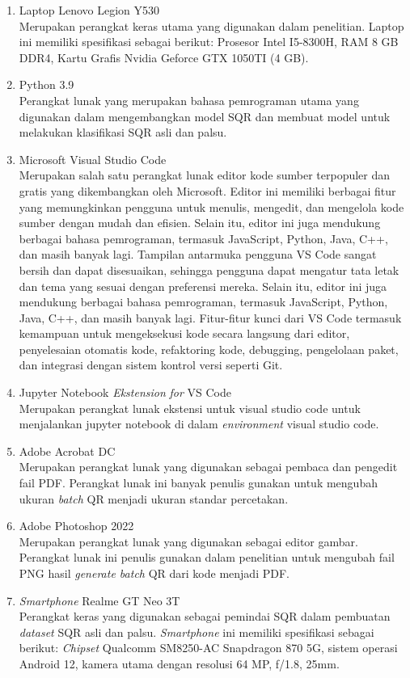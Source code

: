 \begin{enumerate}
	\item Laptop Lenovo Legion Y530\\Merupakan perangkat keras utama yang digunakan dalam penelitian. Laptop ini memiliki spesifikasi sebagai berikut: Prosesor Intel I5-8300H, RAM 8 GB DDR4, Kartu Grafis Nvidia Geforce GTX 1050TI (4 GB).
	\item Python 3.9\\Perangkat lunak yang merupakan bahasa pemrograman utama yang digunakan dalam mengembangkan model SQR dan membuat model untuk melakukan klasifikasi SQR asli dan palsu.
	\item Microsoft Visual Studio Code\\Merupakan salah satu perangkat lunak editor kode sumber terpopuler dan gratis yang dikembangkan oleh Microsoft. Editor ini memiliki berbagai fitur yang memungkinkan pengguna untuk menulis, mengedit, dan mengelola kode sumber dengan mudah dan efisien. Selain itu, editor ini juga mendukung berbagai bahasa pemrograman, termasuk JavaScript, Python, Java, C++, dan masih banyak lagi. Tampilan antarmuka pengguna VS Code sangat bersih dan dapat disesuaikan, sehingga pengguna dapat mengatur tata letak dan tema yang sesuai dengan preferensi mereka. Selain itu, editor ini juga mendukung berbagai bahasa pemrograman, termasuk JavaScript, Python, Java, C++, dan masih banyak lagi. Fitur-fitur kunci dari VS Code termasuk kemampuan untuk mengeksekusi kode secara langsung dari editor, penyelesaian otomatis kode, refaktoring kode, debugging, pengelolaan paket, dan integrasi dengan sistem kontrol versi seperti Git.
	\item Jupyter Notebook \emph{Ekstension} \emph{for} VS Code\\Merupakan perangkat lunak ekstensi untuk visual studio code untuk menjalankan jupyter notebook di dalam \emph{environment} visual studio code.
	\item Adobe Acrobat DC\\Merupakan perangkat lunak yang digunakan sebagai pembaca dan pengedit fail PDF. Perangkat lunak ini banyak penulis gunakan untuk mengubah ukuran \emph{batch} QR menjadi ukuran standar percetakan.
	\item Adobe Photoshop 2022\\Merupakan perangkat lunak yang digunakan sebagai editor gambar. Perangkat lunak ini penulis gunakan dalam penelitian untuk mengubah fail PNG hasil \emph{generate batch} QR dari kode menjadi PDF. 
	\item \emph{Smartphone} Realme GT Neo 3T\\Perangkat keras yang digunakan sebagai pemindai SQR dalam pembuatan \emph{dataset} SQR asli dan palsu. \emph{Smartphone} ini memiliki spesifikasi sebagai berikut: \emph{Chipset} Qualcomm SM8250-AC Snapdragon 870 5G, sistem operasi Android 12, kamera utama dengan resolusi 64 MP, f/1.8, 25mm.

\end{enumerate}
